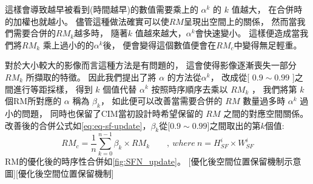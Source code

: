 \documentclass[class=NCU_thesis, crop=false]{standalone}
\begin{document}
	這樣會導致越早被看到(時間越早)的數值需要乘上的 $\alpha^{k}$ 的 $k$ 值越大，
	在合併時的加權也就越小。
	儘管這種做法確實可以使$RM$呈現出空間上的關係，
	然而當我們需要合併的$RM_{k}$越多時，
	隨著$k$ 值越來越大，$\alpha^{k}$會快速變小。
	這樣便造成當我們將$RM_{k}$ 乘上過小的的$\alpha^{k}$後，
	便會變得這個數值便會在$RM_{c}$中變得無足輕重。

	對於大小較大的影像而言這種方法是有問題的，
	這會使得影像逐漸喪失一部分$ RM_{k} $ 所擷取的特徵。
	因此我們提出了將 $\alpha$ 的方法從$\alpha^{k}$，
	改成從[ $0.9 \sim 0.99$ ]之間進行等距採樣，
	得到 $k$ 個值代替 $\alpha^{k}$ 按照時序順序去乘以 $RM_{k}$ ，
	我們將第 $k$ 個RM所對應的 $\alpha$ 稱為 $\beta_{k}$，
	如此便可以改善當需要合併的 $RM$ 數量過多時 $\alpha^{k}$ 過小的問題，
	同時也保留了CIM當初設計時希望保留的 $RM$ 之間的對應空間關係。\\
	改善後的合併公式如\cref{eq:eq-sf-update}，$\beta_{k}$從[$0.9 \sim 0.99$]之間取出的第$k$個值:\\
		\begin{equation}
		    \label{eq:eq-sf-update}
		    RM_{c}=\frac{1}{n} \sum_{k = 0}^{n-1} \beta_{k} \times RM_{k}  \qquad ,\ where\ n = \textit{H}^{i}_{SF} \times \textit{W}^{i}_{SF}
		\end{equation}
	RM的優化後的時序性合併如\cref{fig:SFN_update}。
	[優化後空間位置保留機制示意圖][優化後空間位置保留機制]



\end{document}
